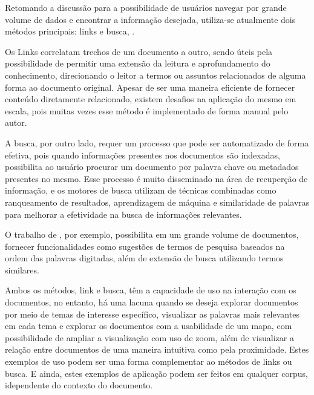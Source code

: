 \documentclass[12pt,a4paper]{article}
\begin{document}
 
 Retomando a discussão para a possibilidade de usuários navegar por grande volume de dados e encontrar a informação desejada, utiliza-se atualmente dois métodos principais:
 links e busca, . 
 
 Os Links correlatam trechos de um documento a outro, sendo úteis pela possibilidade de permitir uma extensão da leitura e aprofundamento do conhecimento,
 direcionando o leitor a termos ou assuntos relacionados de alguma forma ao documento original. Apesar de ser uma maneira eficiente de fornecer conteúdo diretamente relacionado,
 existem desafios na aplicação do mesmo em escala, pois muitas vezes esse método é implementado de forma manual pelo autor. 
 
 A busca, por outro lado,
 requer um processo que pode ser automatizado de forma efetiva, pois quando informações presentes nos documentos são indexadas, possibilita ao usuário procurar um documento por palavra chave ou metadados presentes no mesmo.
 Esse processo é muito disseminado na área de recuperção de informação, e os motores de busca utilizam de técnicas combinadas como ranqueamento de resultados, aprendizagem de máquina e similaridade de palavras para melhorar a efetividade na busca de informações relevantes.

 O trabalho de , por exemplo, possibilita em um grande volume de documentos, fornecer funcionalidades como sugestões de termos de pesquisa baseados na ordem das palavras digitadas, além de extensão de busca utilizando termos similares.

Ambos os métodos, link e busca, têm a capacidade de uso na interação com os documentos, no entanto, há uma lacuna quando se deseja explorar documentos por meio de temas de interesse específico,
 visualizar as palavras mais relevantes em cada tema e explorar os documentos com a usabilidade de um mapa, com possibilidade de ampliar a visualização com uso de zoom, além de visualizar a relação entre documentos de uma maneira intuitiva como pela proximidade. Estes exemplos de uso podem ser uma forma complementar ao métodos de links ou busca. E ainda, estes exemplos de aplicação podem ser feitos em qualquer corpus, idependente do contexto do documento.
 
\end{document}
